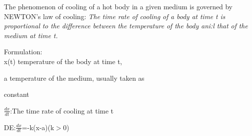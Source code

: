 \documentclass[11pt]{amsbook}
\begin{document}
    The phenomenon of cooling of a hot body in a given medium 
    is governed by NEWTON's law of cooling: \textit{The time rate of cooling 
    of a body at time t is proportional to the difference between 
    the temperature of the body ani:l that of the medium at time t.}\\


\par Formulation:\\

\setlength{\parindent}{10ex}x(t) temperature of the body at time t,

\setlength{\parindent}{12ex}a temperature of the medium, usually taken as

\setlength{\parindent}{15ex}constant
 
\setlength{\parindent}{10ex}$\frac{dx}{dt}$:The time rate of cooling at time t

\setlength{\parindent}{10ex}DE:$\frac{dx}{dt}$=-k(x-a)\hspace{10pt}(k$>$0)
 
 
\end{document}
